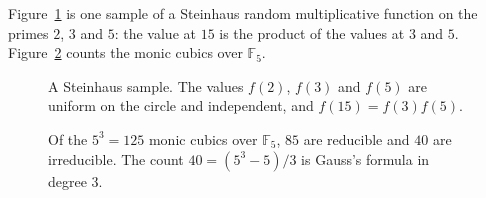 Figure~\ref{fig:v15c04-phases} is one sample of a Steinhaus random multiplicative function on the primes \(2\), \(3\) and \(5\): the value at \(15\) is the product of the values at \(3\) and \(5\). Figure~\ref{fig:v15c04-cubics} counts the monic cubics over \(\mathbb F_5\).

\begin{figure}[ht]
\centering
{}
\caption{A Steinhaus sample. The values \(f(2)\), \(f(3)\) and \(f(5)\) are uniform on the circle and independent, and \(f(15)=f(3)f(5)\).}
\label{fig:v15c04-phases}
\end{figure}

\begin{figure}[ht]
\centering
{}
\caption{Of the \(5^3=125\) monic cubics over \(\mathbb F_5\), \(85\) are reducible and \(40\) are irreducible. The count \(40=(5^3-5)/3\) is Gauss's formula in degree \(3\).}
\label{fig:v15c04-cubics}
\end{figure}
